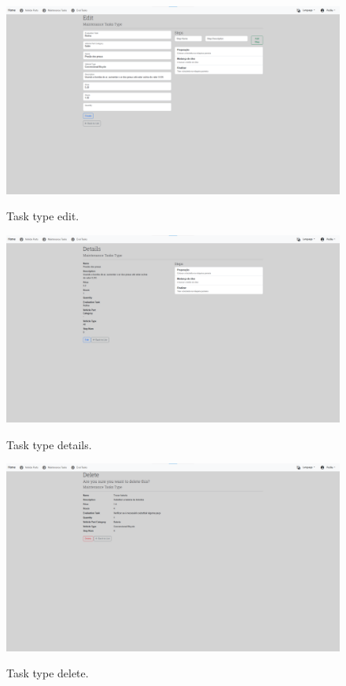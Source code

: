 \begin{figure}[htbp]
  \caption{Task type edit.}
  \centering
  \includegraphics[width=\textwidth]{figs/Implementation/dealershipAdmin/taskEdit}
  \label{fig:taskEdit}
\end{figure}


\begin{figure}[htbp]
  \caption{Task type details.}
  \centering
  \includegraphics[width=\textwidth]{figs/Implementation/dealershipAdmin/taskDetails}
  \label{fig:taskDetails}
\end{figure}

 
\begin{figure}[htbp]
  \caption{Task type delete.}
  \centering
  \includegraphics[width=\textwidth]{figs/Implementation/dealershipAdmin/taskDelete}
  \label{fig:taskDelete}
\end{figure}


